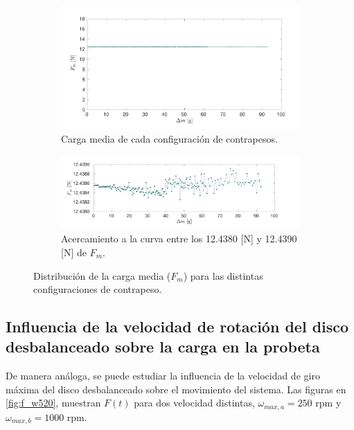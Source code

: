 \begin{figure}[H]
\centering
	\begin{subfigure}{1\linewidth}
		\centering
		\includegraphics[width=1\linewidth]{Imagenes/fm_dm.pdf}
		\caption{Carga media de cada configuración de contrapesos.}\label{fig:fm_dm}
	\end{subfigure}
	\begin{subfigure}{1\linewidth}
		\centering
		\includegraphics[width=1\linewidth]{Imagenes/fm_dmsp.pdf}
		\caption{Acercamiento a la curva entre los 12.4380 [N] y 12.4390 [N] de $F_m$. }\label{fig:fm_dmsp}
	\end{subfigure}
\par\bigskip
\caption{Distribución de la carga media ($F_m$) para las distintas configuraciones de contrapeso.}
\label{fig:velt_12}
\end{figure}

\newpage

\subsection{Influencia de la velocidad de rotación del disco desbalanceado sobre la carga en la probeta}

De manera análoga, se puede estudiar la influencia de la velocidad de giro máxima del disco desbalanceado sobre el movimiento del sistema. Las figuras en \ref{fig:f_w520}, muestran $F(t)$ para dos velocidad distintas, $\omega_{max,a} = 250$ rpm y $\omega_{max,b}=1000$ rpm. 

